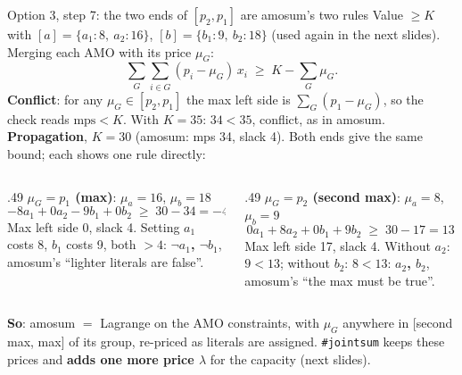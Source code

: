 \documentclass[aspectratio=169,11pt]{beamer}
\begin{document}
\begin{frame}{Option 3, step 7: the two ends of $[p_2, p_1]$ are amosum's two rules}
\scriptsize
Value $\ge K$ with $[a] = \{a_1{:}8,\ a_2{:}16\}$, $[b] = \{b_1{:}9,\ b_2{:}18\}$ (used again in the next slides).
Merging each AMO with its price $\mu_G$:
\[
\sum_G \sum_{i\in G} (p_i - \mu_G)\,x_i \;\ge\; K - \sum_G \mu_G .
\]
\textbf{Conflict}: for any $\mu_G \in [p_2, p_1]$ the max left side is $\sum_G (p_1 - \mu_G)$, so the check reads
$\text{mps} < K$. With $K = 35$: $34 < 35$, conflict, as in amosum.\\[1mm]
\textbf{Propagation}, $K = 30$ (amosum: mps 34, slack 4). Both ends give the same bound; each shows one rule directly:\\[1mm]
\begin{columns}[T]
\begin{column}{.49\textwidth}
\textcolor{acc}{\textbf{$\mu_G = p_1$ (max)}}: $\mu_a = 16$, $\mu_b = 18$
\[
-8a_1 + 0a_2 - 9b_1 + 0b_2 \;\ge\; 30 - 34 = -4
\]
Max left side 0, slack 4. Setting $a_1$ costs 8, $b_1$ costs 9, both $> 4$:
\textbf{$\neg a_1$, $\neg b_1$}, amosum's ``lighter literals are false''.
\end{column}
\begin{column}{.49\textwidth}
\textcolor{acc}{\textbf{$\mu_G = p_2$ (second max)}}: $\mu_a = 8$, $\mu_b = 9$
\[
0a_1 + 8a_2 + 0b_1 + 9b_2 \;\ge\; 30 - 17 = 13
\]
Max left side 17, slack 4. Without $a_2$: $9 < 13$; without $b_2$: $8 < 13$:
\textbf{$a_2$, $b_2$}, amosum's ``the max must be true''.
\end{column}
\end{columns}
\vspace{2mm}
\textbf{So}: amosum $=$ Lagrange on the AMO constraints, with $\mu_G$ anywhere in [second max, max] of its group, re-priced as
literals are assigned. \texttt{\#jointsum} keeps these prices and \textbf{adds one more price $\lambda$} for the capacity (next slides).
\end{frame}
\end{document}
